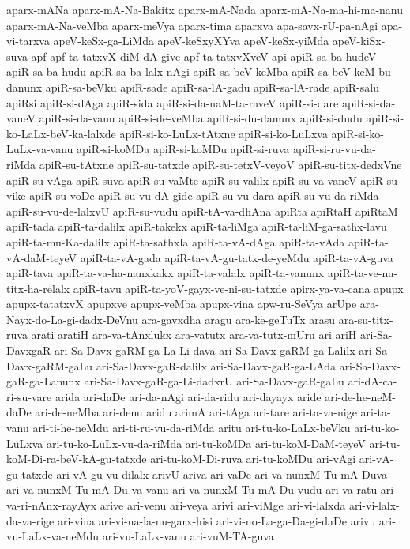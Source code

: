 {aparx-mANa
aparx-mA-Na-Bakitx
aparx-mA-Nada
aparx-mA-Na-ma-hi-ma-nanu
aparx-mA-Na-veMba
aparx-meVya
aparx-tima
aparxva
apa-savx-rU-pa-nAgi
apa-vi-tarxva
apeV-keSx-ga-LiMda
apeV-keSxyXYva
apeV-keSx-yiMda
apeV-kiSx-suva
apf
apf-ta-tatxvX-diM-dA-give
apf-ta-tatxvXveV
api
apiR-sa-ba-hudeV
apiR-sa-ba-hudu
apiR-sa-ba-lalx-nAgi
apiR-sa-beV-keMba
apiR-sa-beV-keM-bu-danunx
apiR-sa-beVku
apiR-sade
apiR-sa-lA-gadu
apiR-sa-lA-rade
apiR-salu
apiRsi
apiR-si-dAga
apiR-sida
apiR-si-da-naM-ta-raveV
apiR-si-dare
apiR-si-da-vaneV
apiR-si-da-vanu
apiR-si-de-veMba
apiR-si-du-danunx
apiR-si-dudu
apiR-si-ko-LaLx-beV-ka-lalxde
apiR-si-ko-LuLx-tAtxne
apiR-si-ko-LuLxva
apiR-si-ko-LuLx-va-vanu
apiR-si-koMDa
apiR-si-koMDu
apiR-si-ruva
apiR-si-ru-vu-da-riMda
apiR-su-tAtxne
apiR-su-tatxde
apiR-su-tetxV-veyoV
apiR-su-titx-dedxVne
apiR-su-vAga
apiR-suva
apiR-su-vaMte
apiR-su-valilx
apiR-su-va-vaneV
apiR-su-vike
apiR-su-voDe
apiR-su-vu-dA-gide
apiR-su-vu-dara
apiR-su-vu-da-riMda
apiR-su-vu-de-lalxvU
apiR-su-vudu
apiR-tA-va-dhAna
apiRta
apiRtaH
apiRtaM
apiR-tada
apiR-ta-dalilx
apiR-takekx
apiR-ta-liMga
apiR-ta-liM-ga-sathx-lavu
apiR-ta-mu-Ka-dalilx
apiR-ta-sathxla
apiR-ta-vA-dAga
apiR-ta-vAda
apiR-ta-vA-daM-teyeV
apiR-ta-vA-gada
apiR-ta-vA-gu-tatx-de-yeMdu
apiR-ta-vA-guva
apiR-tava
apiR-ta-va-ha-nanxkakx
apiR-ta-valalx
apiR-ta-vanunx
apiR-ta-ve-nu-titx-ha-relalx
apiR-tavu
apiR-ta-yoV-gayx-ve-ni-su-tatxde
apirx-ya-va-cana
apupx
apupx-tatatxvX
apupxve
apupx-veMba
apupx-vina
apw-ru-SeVya
arUpe
ara-Nayx-do-La-gi-dadx-DeVnu
ara-gavxdha
aragu
ara-ke-geTuTx
arasu
ara-su-titx-ruva
arati
aratiH
ara-va-tAnxlukx
ara-vatutx
ara-va-tutx-mUru
ari
ariH
ari-Sa-DavxgaR
ari-Sa-Davx-gaRM-ga-La-Li-dava
ari-Sa-Davx-gaRM-ga-Lalilx
ari-Sa-Davx-gaRM-gaLu
ari-Sa-Davx-gaR-dalilx
ari-Sa-Davx-gaR-ga-LAda
ari-Sa-Davx-gaR-ga-Lanunx
ari-Sa-Davx-gaR-ga-Li-dadxrU
ari-Sa-Davx-gaR-gaLu
ari-dA-ca-ri-su-vare
arida
ari-daDe
ari-da-nAgi
ari-da-ridu
ari-dayayx
aride
ari-de-he-neM-daDe
ari-de-neMba
ari-denu
aridu
arimA
ari-tAga
ari-tare
ari-ta-va-nige
ari-ta-vanu
ari-ti-he-neMdu
ari-ti-ru-vu-da-riMda
aritu
ari-tu-ko-LaLx-beVku
ari-tu-ko-LuLxva
ari-tu-ko-LuLx-vu-da-riMda
ari-tu-koMDa
ari-tu-koM-DaM-teyeV
ari-tu-koM-Di-ra-beV-kA-gu-tatxde
ari-tu-koM-Di-ruva
ari-tu-koMDu
ari-vAgi
ari-vA-gu-tatxde
ari-vA-gu-vu-dilalx
arivU
ariva
ari-vaDe
ari-va-nunxM-Tu-mA-Duva
ari-va-nunxM-Tu-mA-Du-va-vanu
ari-va-nunxM-Tu-mA-Du-vudu
ari-va-ratu
ari-va-ri-nAnx-rayAyx
arive
ari-venu
ari-veya
arivi
ari-viMge
ari-vi-lalxda
ari-vi-lalx-da-va-rige
ari-vina
ari-vi-na-la-nu-garx-hisi
ari-vi-no-La-ga-Da-gi-daDe
arivu
ari-vu-LaLx-va-neMdu
ari-vu-LaLx-vanu
ari-vuM-TA-guva
}
